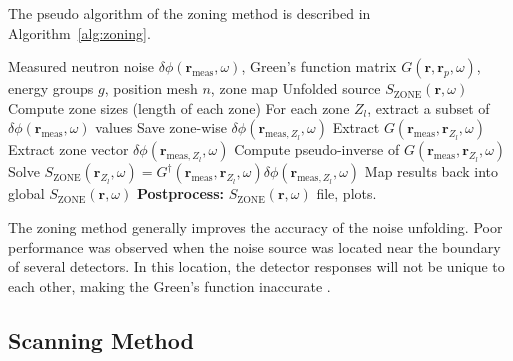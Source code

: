 The pseudo algorithm of the zoning method is described in Algorithm~\ref{alg:zoning}.
\begin{algorithm}[H]
\caption{: Zoning Method}
\label{alg:zoning}
\begin{algorithmic}[1]
\Require Measured neutron noise $\delta \phi(\textbf{r}_{\text{meas}}, \omega)$, Green’s function matrix $G(\textbf{r}, \textbf{r}_p,\omega)$, energy groups $g$, position mesh $n$, zone map
\Ensure Unfolded source $S_{\text{ZONE}}(\textbf{r}, \omega)$
\State Compute zone sizes (length of each zone) 
\State For each zone $Z_l$, extract a subset of $\delta \phi(\textbf{r}_{\text{meas}}, \omega)$ values 
\State Save zone-wise $\delta \phi(\textbf{r}_{\text{meas}, Z_l}, \omega)$
 
    \State Extract $G(\textbf{r}_{\text{meas}}, \textbf{r}_{Z_l},\omega)$
\EndFor
{} 
    \State Extract zone vector $\delta \phi(\textbf{r}_{\text{meas}, Z_l}, \omega)$
    \State Compute pseudo-inverse of $G(\textbf{r}_{\text{meas}}, \textbf{r}_{Z_l},\omega)$
    \State Solve $S_{\text{ZONE}}(\textbf{r}_{Z_l},\omega) = G^{\dagger}(\textbf{r}_{\text{meas}}, \textbf{r}_{Z_l},\omega) \delta \phi(\textbf{r}_{\text{meas}, Z_l}, \omega)$
    \State Map results back into global $S_{\text{ZONE}}(\textbf{r},\omega)$
\EndFor
\State \textbf{Postprocess:} $S_\text{ZONE}(\textbf{r},\omega)$ file, plots. 
\end{algorithmic}
\end{algorithm}

The zoning method generally improves the accuracy of the noise unfolding. Poor performance was observed when the noise source was located near the boundary of several detectors. In this location, the detector responses will not be unique to each other, making the Green’s function inaccurate \cite{demaziereIdentificationLocalizationAbsorbers2005}.

\subsection{Scanning Method}


